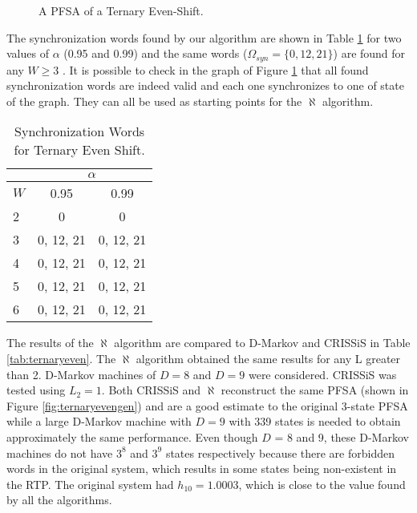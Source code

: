 {\begin{figure}
\centering
{}
\caption{A PFSA of a Ternary Even-Shift.\label{fig:ternaryeven}}
\end{figure}

The synchronization words found by our algorithm are shown in Table \ref{tab:ternaryevensynch} for two values of $\alpha$ (0.95 and 0.99) and the same words ($\Omega_{syn} = \{0, 12, 21\}$) are found for any $W \geq 3$ . It is possible to check in the graph of Figure \ref{fig:ternaryeven} that all found synchronization words are indeed valid and each one synchronizes to one of state of the graph. They can all be used as starting points for the $\aleph$ algorithm.

\begin{table}
\centering
\caption{Synchronization Words for Ternary Even Shift. \label{tab:ternaryevensynch}}
\begin{tabular}{|l|c|c|}
\hline
 & \multicolumn{2}{c|}{$\alpha$}\\
 \hline
$W$ & 0.95 & 0.99 \\
\hline
2 & 0 & 0 \\ 
3 & 0, 12, 21 & 0, 12, 21 \\ 
4 & 0, 12, 21 & 0, 12, 21 \\ 
5 & 0, 12, 21 & 0, 12, 21 \\
6 & 0, 12, 21 & 0, 12, 21 \\
 \hline
\end{tabular}
\end{table}

The results of the $\aleph$ algorithm are compared to D-Markov and CRISSiS in Table \ref{tab:ternaryeven}. The $\aleph$ algorithm obtained the same results for any L greater than 2. D-Markov machines of $D = 8$ and $D = 9$ were considered. CRISSiS was tested using $L_2 = 1$. Both CRISSiS and $\aleph$ reconstruct the same PFSA (shown in Figure \ref{fig:ternaryevengen}) and are a good estimate to the original 3-state PFSA  while a large D-Markov machine with $D=9$ with 339 states is needed to obtain approximately the same performance. Even though $D$ = 8 and 9, these D-Markov machines do not have $3^{8}$ and $3^{9}$ states respectively because there are forbidden words in the original system, which results in some states being non-existent in the RTP. The original system had $h_{10} = 1.0003$, which is close to the value found by all the algorithms.

}

